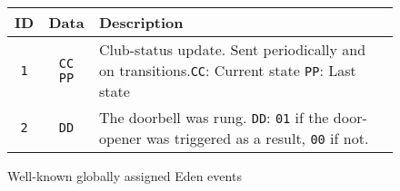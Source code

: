 \documentclass[a4paper]{scrartcl}
\newcommand{\EDEN}{{\sc Eden}}
\begin{document}
\begin{figure}[h]
  \centering
  \begin{tabular}{|c|c|p{10cm}|}
    \hline
    ID & Data & Description \\
    \hline
    \texttt{1} & \texttt{CC PP} & Club-status update. Sent periodically and on
    transitions.\newline \texttt{CC}: Current state \newline
    \texttt{PP}: Last state \\
    \hline
    \texttt{2} & \texttt{DD} & The doorbell was rung. \newline
    \texttt{DD}: \texttt{01} if the door-opener was triggered as a
    result, \texttt{00} if not. \\
    \hline
  \end{tabular}
  \caption{Well-known globally assigned \EDEN{} events}
  \label{fig:eden-global-events}
\end{figure}
\end{document}
